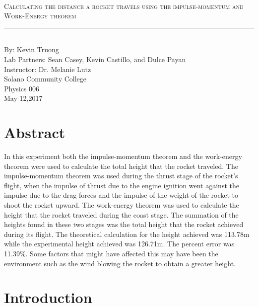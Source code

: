 \documentclass[aps,letterpaper,11pt]{revtex4}
\newcommand{\labno}{11}
\newcommand{\labtitle}{Calculating the distance a rocket travels using the impulse-momentum and Work-Energy theorem }
\newcommand{\authorname}{Kevin Truong}
\newcommand{\professor}{Dr. Melanie Lutz}
\newcommand{\classno}{Physics 006}
\newcommand{\labpartners}{Sean Casey, Kevin Castillo, and Dulce Payan}
\newcommand{\submitdate}{May 12,2017}
\begin{document}
\begin{titlepage}
\begin{center}
\hspace{-136mm}\boxed{{\Large \textsc{Lab No. \labno}}}\\\vspace{30mm}
{\Large \textsc{\labtitle} \\ \vspace{4pt}}
\rule[13pt]{\textwidth}{1pt}\\ \vspace{150pt}
{\large By: \authorname \\ \vspace{10pt}}
Lab Partners: \labpartners \\
Instructor: \professor \vspace{10pt} \\
Solano Community College\\ \classno \\ \vspace{10pt}
\submitdate
\end{center}
\end{titlepage}

\section{Abstract}

In this experiment both the impulse-momentum theorem and the work-energy theorem were used to calculate the total height that the rocket traveled. The impulse-momentum theorem was used during the thrust stage of the rocket's flight, when the impulse of thrust due to the engine ignition went against the impulse due to the drag forces and the impulse of the weight of the rocket to shoot the rocket upward. The work-energy theorem was used to calculate the height that the rocket traveled during the coast stage. The summation of the heights found in these two stages was the total height that the rocket achieved during its flight. The theoretical calculation for the height achieved was 113.78m while the experimental height achieved was 126.71m. The percent error was 11.39\%. Some factors that might have affected this may have been the environment such as the wind blowing the rocket to obtain a greater height.

\section{Introduction}
\end{document}
